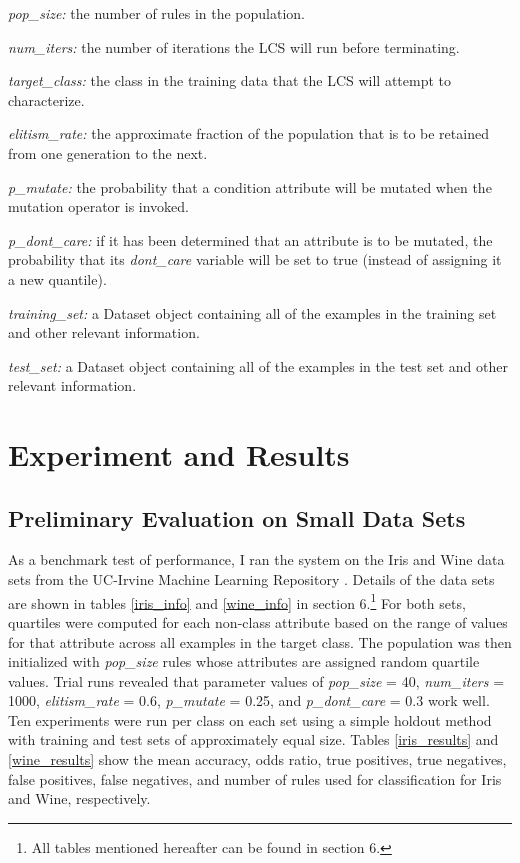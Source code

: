 \documentclass[12pt]{article}
\begin{document}
\begin{description}
\item \textit{pop\_size:} the number of rules in the population.
\item \textit{num\_iters:} the number of iterations the LCS will run before terminating.
\item \textit{target\_class:} the class in the training data that the LCS will attempt to characterize.
\item \textit{elitism\_rate:} the approximate fraction of the population that is to be retained from one generation to the next.
\item \textit{p\_mutate:} the probability that a condition attribute will be mutated when the mutation operator is invoked.
\item \textit{p\_dont\_care:} if it has been determined that an attribute is to be mutated, the probability that its \textit{dont\_care} variable will be set to true (instead of assigning it a new quantile).
\item \textit{training\_set:} a Dataset object containing all of the examples in the training set and other relevant information.
\item \textit{test\_set:} a Dataset object containing all of the examples in the test set and other relevant information.
\end{description}

\section{Experiment and Results}

\subsection{Preliminary Evaluation on Small Data Sets}

As a benchmark test of performance, I ran the system on the Iris and Wine data sets from the UC-Irvine Machine Learning Repository \cite{noauthor_uci_nodate-1,noauthor_uci_nodate}. Details of the data sets are shown in tables \ref{iris_info} and \ref{wine_info} in section 6.\footnote{All tables mentioned hereafter can be found in section 6.} For both sets, quartiles were computed for each non-class attribute based on the range of values for that attribute across all examples in the target class. The population was then initialized with \textit{pop\_size} rules whose attributes are assigned random quartile values. Trial runs revealed that parameter values of \textit{pop\_size} = 40, \textit{num\_iters} = 1000, \textit{elitism\_rate} = 0.6, \textit{p\_mutate} = 0.25, and \textit{p\_dont\_care} = 0.3 work well. Ten experiments were run per class on each set using a simple holdout method with training and test sets of approximately equal size. Tables \ref{iris_results} and \ref{wine_results} show the mean accuracy, odds ratio, true positives, true negatives, false positives, false negatives, and number of rules used for classification for Iris and Wine, respectively. 
\end{document}
